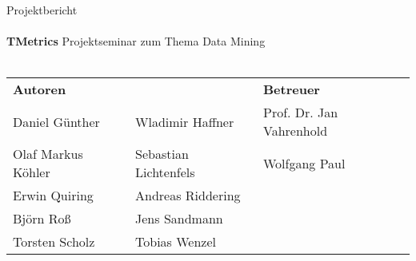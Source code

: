 \begin{titlepage}
	\begin{center}
		{\Large Projektbericht} \vspace{24pt} \\
		\HRule \vspace{6pt} \\
 		{\Huge \textbf{\quad\quad\quad\hspace{-0.05cm} TMetrics} \newline \Large Projektseminar zum Thema Data Mining} \vspace{6pt} \\
 		\HRule \vspace{24pt} \\
		\begin{minipage}{.5\textwidth}
		\begin{tabular}{l l l}
			{\large \textbf{Autoren}} & & {\large \textbf{Betreuer}} \\
			Daniel Günther & Wladimir Haffner & Prof. Dr. Jan Vahrenhold \\
			Olaf Markus Köhler & Sebastian Lichtenfels  & Wolfgang Paul \\	
			Erwin Quiring & Andreas Riddering & \\
			Björn Roß & Jens Sandmann & \\
			Torsten Scholz & Tobias Wenzel & \\
		\end{tabular}
		\end{minipage} 
		\hfill
		\begin{minipage}{.4\textwidth}
			\begin{flushright}
			\end{flushright}
		\end{minipage}
	\end{center}	
\end{titlepage}
